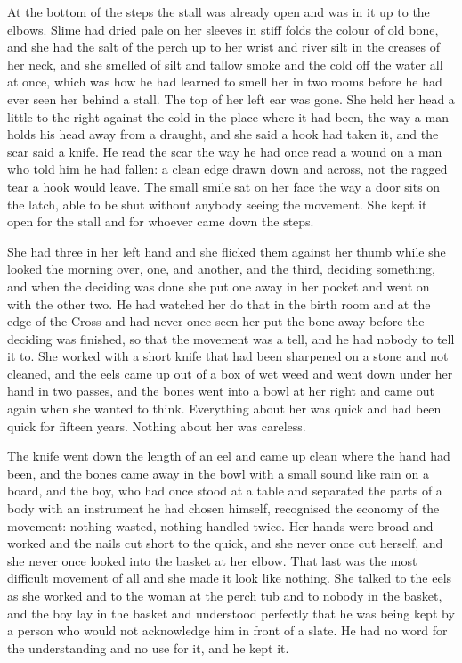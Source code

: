 At the bottom of the steps the stall was already open and  was in it up to the elbows. Slime had dried pale on her sleeves in stiff folds the colour of old bone, and she had the salt of the perch up to her wrist and river silt in the creases of her neck, and she smelled of silt and tallow smoke and the cold off the water all at once, which was how he had learned to smell her in two rooms before he had ever seen her behind a stall. The top of her left ear was gone. She held her head a little to the right against the cold in the place where it had been, the way a man holds his head away from a draught, and she said a hook had taken it, and the scar said a knife. He read the scar the way he had once read a wound on a man who told him he had fallen: a clean edge drawn down and across, not the ragged tear a hook would leave. The small smile sat on her face the way a door sits on the latch, able to be shut without anybody seeing the movement. She kept it open for the stall and for whoever came down the steps.

She had three  in her left hand and she flicked them against her thumb while she looked the morning over, one, and another, and the third, deciding something, and when the deciding was done she put one away in her pocket and went on with the other two. He had watched her do that in the birth room and at the edge of the Cross and had never once seen her put the bone away before the deciding was finished, so that the movement was a tell, and he had nobody to tell it to. She worked with a short knife that had been sharpened on a stone and not cleaned, and the eels came up out of a box of wet weed and went down under her hand in two passes, and the bones went into a bowl at her right and came out again when she wanted to think. Everything about her was quick and had been quick for fifteen years. Nothing about her was careless.

The knife went down the length of an eel and came up clean where the hand had been, and the bones came away in the bowl with a small sound like rain on a board, and the boy, who had once stood at a table and separated the parts of a body with an instrument he had chosen himself, recognised the economy of the movement: nothing wasted, nothing handled twice. Her hands were broad and worked and the nails cut short to the quick, and she never once cut herself, and she never once looked into the basket at her elbow. That last was the most difficult movement of all and she made it look like nothing. She talked to the eels as she worked and to the woman at the perch tub and to nobody in the basket, and the boy lay in the basket and understood perfectly that he was being kept by a person who would not acknowledge him in front of a slate. He had no word for the understanding and no use for it, and he kept it.

